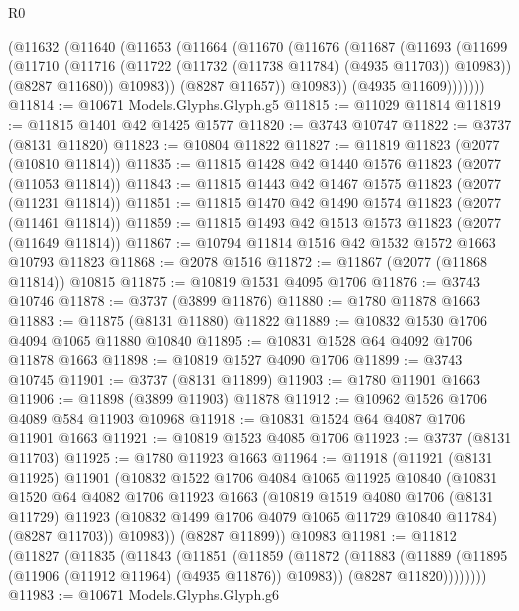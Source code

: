 \begin{lexlean}{R0}
\begin{coremodule}
        (@11632
          (@11640
            (@11653
              (@11664
                (@11670
                  (@11676
                    (@11687
                      (@11693
                        (@11699
                          (@11710
                            (@11716 (@11722 (@11732 (@11738 @11784) (@4935 @11703)) @10983))
                            (@8287 @11680))
                          @10983))
                      (@8287 @11657))
                    @10983))
                (@4935 @11609)))))))
@11814 := @10671 Models.Glyphs.Glyph.g5
@11815 := @11029 @11814
@11819 := @11815 @1401 @42 @1425 @1577
@11820 := @3743 @10747
@11822 := @3737 (@8131 @11820)
@11823 := @10804 @11822
@11827 := @11819 @11823 (@2077 (@10810 @11814))
@11835 := @11815 @1428 @42 @1440 @1576 @11823 (@2077 (@11053 @11814))
@11843 := @11815 @1443 @42 @1467 @1575 @11823 (@2077 (@11231 @11814))
@11851 := @11815 @1470 @42 @1490 @1574 @11823 (@2077 (@11461 @11814))
@11859 := @11815 @1493 @42 @1513 @1573 @11823 (@2077 (@11649 @11814))
@11867 := @10794 @11814 @1516 @42 @1532 @1572 @1663 @10793 @11823
@11868 := @2078 @1516
@11872 := @11867 (@2077 (@11868 @11814)) @10815
@11875 := @10819 @1531 @4095 @1706
@11876 := @3743 @10746
@11878 := @3737 (@3899 @11876)
@11880 := @1780 @11878 @1663
@11883 := @11875 (@8131 @11880) @11822
@11889 := @10832 @1530 @1706 @4094 @1065 @11880 @10840
@11895 := @10831 @1528 @64 @4092 @1706 @11878 @1663
@11898 := @10819 @1527 @4090 @1706
@11899 := @3743 @10745
@11901 := @3737 (@8131 @11899)
@11903 := @1780 @11901 @1663
@11906 := @11898 (@3899 @11903) @11878
@11912 := @10962 @1526 @1706 @4089 @584 @11903 @10968
@11918 := @10831 @1524 @64 @4087 @1706 @11901 @1663
@11921 := @10819 @1523 @4085 @1706
@11923 := @3737 (@8131 @11703)
@11925 := @1780 @11923 @1663
@11964 := @11918
    (@11921
      (@8131 @11925)
      @11901
      (@10832
        @1522
        @1706
        @4084
        @1065
        @11925
        @10840
        (@10831
          @1520
          @64
          @4082
          @1706
          @11923
          @1663
          (@10819
            @1519
            @4080
            @1706
            (@8131 @11729)
            @11923
            (@10832 @1499 @1706 @4079 @1065 @11729 @10840 @11784)
            (@8287 @11703))
          @10983))
      (@8287 @11899))
    @10983
@11981 := @11812
    (@11827
      (@11835
        (@11843
          (@11851
            (@11859
              (@11872
                (@11883
                  (@11889 (@11895 (@11906 (@11912 @11964) (@4935 @11876)) @10983))
                  (@8287 @11820))))))))
@11983 := @10671 Models.Glyphs.Glyph.g6

\end{coremodule}
\end{lexlean}
